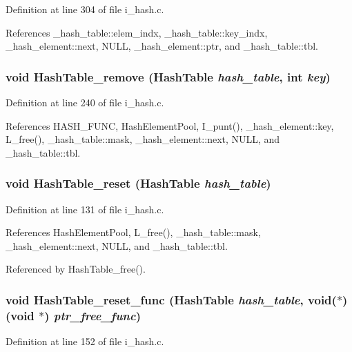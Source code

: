 Definition at line 304 of file i\_\-hash.c.

References \_\-hash\_\-table::elem\_\-indx, \_\-hash\_\-table::key\_\-indx, \_\-hash\_\-element::next, NULL, \_\-hash\_\-element::ptr, and \_\-hash\_\-table::tbl.
\subsubsection{\setlength{\rightskip}{0pt plus 5cm}void Hash\-Table\_\-remove (\bf{Hash\-Table} {\em hash\_\-table}, int {\em key})}\label{i__hash_8c_c6da04ef7158c1acb2f51ace02a6328d}




Definition at line 240 of file i\_\-hash.c.

References HASH\_\-FUNC, Hash\-Element\-Pool, I\_\-punt(), \_\-hash\_\-element::key, L\_\-free(), \_\-hash\_\-table::mask, \_\-hash\_\-element::next, NULL, and \_\-hash\_\-table::tbl.
\subsubsection{\setlength{\rightskip}{0pt plus 5cm}void Hash\-Table\_\-reset (\bf{Hash\-Table} {\em hash\_\-table})}\label{i__hash_8c_20bd9c4f2ba872347f363ba175dbd9a3}




Definition at line 131 of file i\_\-hash.c.

References Hash\-Element\-Pool, L\_\-free(), \_\-hash\_\-table::mask, \_\-hash\_\-element::next, NULL, and \_\-hash\_\-table::tbl.

Referenced by Hash\-Table\_\-free().
\subsubsection{\setlength{\rightskip}{0pt plus 5cm}void Hash\-Table\_\-reset\_\-func (\bf{Hash\-Table} {\em hash\_\-table}, void($\ast$)(void $\ast$) {\em ptr\_\-free\_\-func})}\label{i__hash_8c_bd05eb52a931576fa22dd08b47aa2411}




Definition at line 152 of file i\_\-hash.c.

